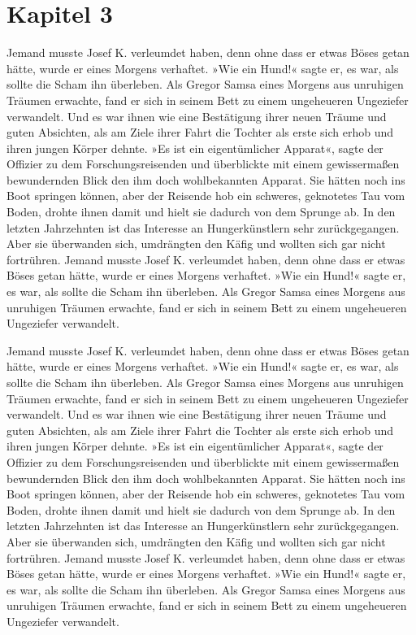 \chapter{Kapitel 3}
\label{chap:kapitel3}

Jemand musste Josef K. verleumdet haben, denn ohne dass er etwas Böses
getan hätte, wurde er eines Morgens verhaftet. »Wie ein Hund!« sagte er,
es war, als sollte die Scham ihn überleben. Als Gregor Samsa eines
Morgens aus unruhigen Träumen erwachte, fand er sich in seinem Bett zu
einem ungeheueren Ungeziefer verwandelt. Und es war ihnen wie eine
Bestätigung ihrer neuen Träume und guten Absichten, als am Ziele ihrer
Fahrt die Tochter als erste sich erhob und ihren jungen Körper dehnte.
»Es ist ein eigentümlicher Apparat«, sagte der Offizier zu dem
Forschungsreisenden und überblickte mit einem gewissermaßen bewundernden
Blick den ihm doch wohlbekannten Apparat. Sie hätten noch ins Boot
springen können, aber der Reisende hob ein schweres, geknotetes Tau vom
Boden, drohte ihnen damit und hielt sie dadurch von dem Sprunge ab. In
den letzten Jahrzehnten ist das Interesse an Hungerkünstlern sehr
zurückgegangen. Aber sie überwanden sich, umdrängten den Käfig und
wollten sich gar nicht fortrühren. Jemand musste Josef K. verleumdet
haben, denn ohne dass er etwas Böses getan hätte, wurde er eines Morgens
verhaftet. »Wie ein Hund!« sagte er, es war, als sollte die Scham ihn
überleben. Als Gregor Samsa eines Morgens aus unruhigen Träumen
erwachte, fand er sich in seinem Bett zu einem ungeheueren Ungeziefer
verwandelt.


Jemand musste Josef K. verleumdet haben, denn ohne dass er etwas Böses
getan hätte, wurde er eines Morgens verhaftet. »Wie ein Hund!« sagte er,
es war, als sollte die Scham ihn überleben. Als Gregor Samsa eines
Morgens aus unruhigen Träumen erwachte, fand er sich in seinem Bett zu
einem ungeheueren Ungeziefer verwandelt. Und es war ihnen wie eine
Bestätigung ihrer neuen Träume und guten Absichten, als am Ziele ihrer
Fahrt die Tochter als erste sich erhob und ihren jungen Körper dehnte.
»Es ist ein eigentümlicher Apparat«, sagte der Offizier zu dem
Forschungsreisenden und überblickte mit einem gewissermaßen bewundernden
Blick den ihm doch wohlbekannten Apparat. Sie hätten noch ins Boot
springen können, aber der Reisende hob ein schweres, geknotetes Tau vom
Boden, drohte ihnen damit und hielt sie dadurch von dem Sprunge ab. In
den letzten Jahrzehnten ist das Interesse an Hungerkünstlern sehr
zurückgegangen. Aber sie überwanden sich, umdrängten den Käfig und
wollten sich gar nicht fortrühren. Jemand musste Josef K. verleumdet
haben, denn ohne dass er etwas Böses getan hätte, wurde er eines Morgens
verhaftet. »Wie ein Hund!« sagte er, es war, als sollte die Scham ihn
überleben. Als Gregor Samsa eines Morgens aus unruhigen Träumen
erwachte, fand er sich in seinem Bett zu einem ungeheueren Ungeziefer
verwandelt.


